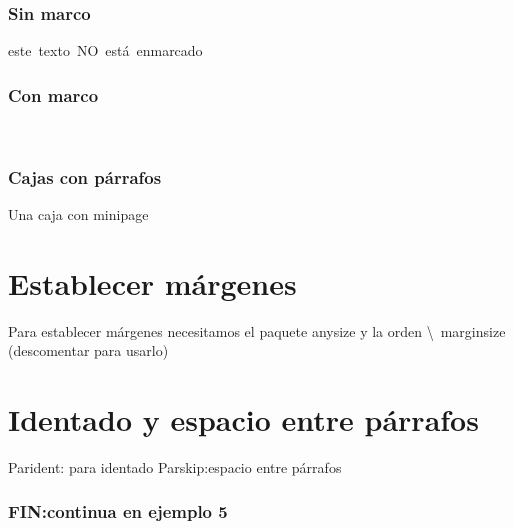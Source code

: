 \documentclass[a4paper,11pt]{article}
\begin{document}
\section{Sin marco}
\mbox{este texto NO está enmarcado}

\section{Con marco}
\\

\section{Cajas con párrafos}

\begin{minipage}[b]{0.5\linewidth}%
Una caja con minipage
\end{minipage}
 \part{Establecer márgenes}
 Para establecer márgenes necesitamos el paquete anysize y la orden \textbackslash\ marginsize (descomentar para usarlo)
\part{Identado y espacio entre párrafos}
Parident: para identado
Parskip:espacio entre párrafos
\section{FIN:continua en ejemplo 5}
\end{document}

